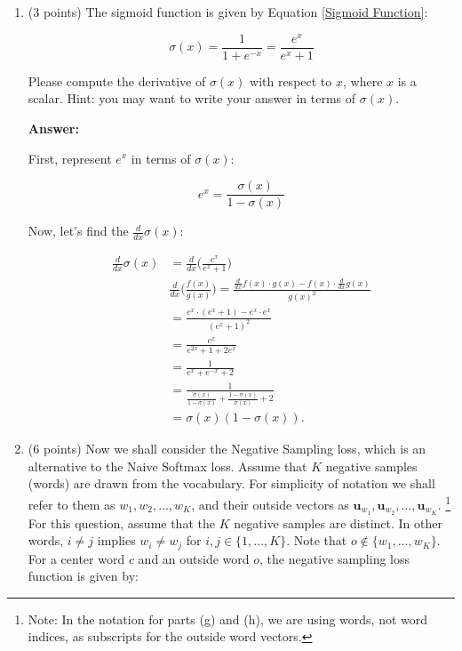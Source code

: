 \documentclass{article}
\newenvironment{answer}{
    {\bf Answer:} \sf \begingroup\color{red}
}{\endgroup}%
\begin{document}
\begin{enumerate}[label=(\alph*)]
\item (3 points) The sigmoid function is given by Equation \ref{Sigmoid Function}:

\begin{equation}
    \label{Sigmoid Function}
    \sigma (x) = \frac{1}{1 + e^{-x}} = \frac{e^{x}}{e^{x} + 1}
\end{equation}

Please compute the derivative of $\sigma(x)$ with respect to $x$, where $x$ is a scalar. Hint: you may want to write your answer in terms of $\sigma(x)$.

\begin{shaded}
\begin{answer}

First, represent $e^x$ in terms of $\sigma (x)$:

\begin{equation*}
e^x = \frac{\sigma (x)}{1-\sigma(x)}
\end{equation*}

Now, let's find the $\frac{d}{dx} \sigma(x)$:

\begin{equation*}
\begin{split}
\frac{d}{dx} \sigma(x) & = \frac{d}{dx} \bigg( \frac{e^{x}}{e^{x} + 1} \bigg)\\ 
& \boxed{\frac{d}{dx} \bigg( \frac{f(x)}{g(x)}\bigg) = \frac{\frac{d}{dx} f(x) \cdot g(x)-f(x) \cdot \frac{d}{dx} g(x)}{g(x)^2}  } \\
& = \frac {e^x \cdot (e^x+1) - e^x \cdot e^x}{(e^x+1)^2} \\
& = \frac {e^x}{e^{2x}+1+2e^x}\\
& = \frac {1}{e^x+e^{-x}+2}\\
& = \frac {1}{\frac{\sigma (x)}{1-\sigma(x)}+\frac{1-\sigma(x)}{\sigma(x)}+2}\\
& \boxed{= \sigma(x)(1-\sigma(x)).}
\end{split}
\end{equation*}
\end{answer}
\end{shaded}

\item (6 points) Now we shall consider the Negative Sampling loss, which is an alternative to the Naive Softmax loss.  Assume that $K$ negative samples (words) are drawn from the vocabulary. For simplicity of notation we shall refer to them as $w_1, w_2, \dots, w_K$, and their outside vectors as $\bm u_{w_1}, \bm u_{w_2}, \dots, \bm u_{w_K}$. \footnote{Note: In the notation for parts (g) and (h), we are using words, not word indices, as subscripts for the outside word vectors.} For this question, assume that the $K$ negative samples are distinct. In other words, $i\neq j$ implies $w_i\neq w_j$ for $i,j\in\{1,\dots,K\}$.
Note that $o\notin\{w_1, \dots, w_K\}$. 
For a center word $c$ and an outside word $o$, the negative sampling loss function is given by:


\end{enumerate}
\end{document}
